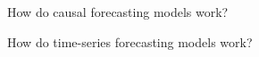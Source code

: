 \begin{exercise}
How do causal forecasting models work?

\end{exercise}


\begin{exercise}
How do time-series forecasting models work?

\end{exercise}



